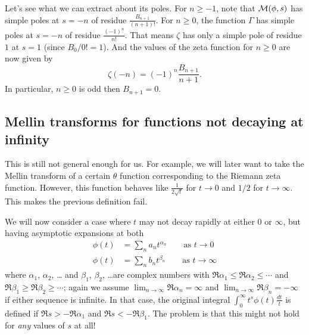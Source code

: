Let's see what we can extract about its poles.
For $n \ge -1$,
note that $\mathcal M(\phi, s)$ has simple poles at $s = -n$
of residue $\frac{B_{n+1}}{(n+1)!}$.
For $n \ge 0$, the function $\Gamma$ has simple poles at $s = -n$
of residue $\frac{(-1)^n}{n!}$.
That means $\zeta$ has only a simple pole of residue $1$ at $s=1$
(since $B_0/0! = 1$).
And the values of the zeta function for $n \ge 0$ are now given by
\[ \zeta(-n) = (-1)^n \frac{B_{n+1}}{n+1}. \]
In particular, $n \ge 0$ is odd then $B_{n+1} = 0$.

\subsection{Mellin transforms for functions not decaying at infinity}
This is still not general enough for us.
For example, we will later want to take the Mellin
transform of a certain $\theta$ function
corresponding to the Riemann zeta function.
However, this function behaves like $\frac{1}{2\sqrt t}$
for $t \to 0$ and $1/2$ for $t \to \infty$.
This makes the previous definition fail.

We will now consider a case where $t$ may not decay
rapidly at either $0$ or $\infty$, but having
asymptotic expansions at both
\begin{align*}
  \phi(t) &= \sum_n a_n t^{\alpha_n} \qquad \text{as }t \to 0 \\
  \phi(t) &= \sum_n b_n t^{\beta_n} \qquad \text{as } t \to \infty
\end{align*}
where $\alpha_1$, $\alpha_2$, \dots
and $\beta_1$, $\beta_2$, \dots are complex numbers
with $\Re \alpha_1 \le \Re \alpha_2 \le \cdots$
and  $\Re \beta_1 \ge \Re \beta_2 \ge \cdots$; again we assume
$\lim_{n \to \infty} \Re \alpha_n = \infty$
and $\lim_{n \to \infty} \Re \beta_n = -\infty$
if either sequence is infinite.
In that case, the original integral
$\int_0^\infty t^s \phi(t) \frac{dt}{t}$ is defined
if $\Re s > - \Re \alpha_1$ and $\Re s < - \Re \beta_1$.
The problem is that this might not hold for \emph{any}
values of $s$ at all!

